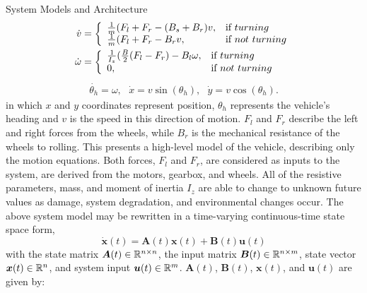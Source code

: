 \begin{section}{System Models and Architecture}
	\begin{equation}
    \begin{split}
    \label{eqn:plant}
    \dot{v}&=\left\{
    \begin{array}{ll}
    \frac{1}{m}(F_l+F_r-(B_s+B_r)v, & \hbox{if } turning\\
    \frac{1}{m}(F_l+F_r-B_rv, & \hbox{if } not~turning
    \end{array}
    \right.\\
    \dot{\omega}&=\left\{
    \begin{array}{ll}
    \frac{1}{I_z}(\frac{B}{2}(F_l-F_r)-B_l\omega, & \hbox{if } turning\\
    0, & \hbox{if } not~turning
    \end{array}
    \right.\\
    \end{split}
    \end{equation}
    \begin{align}
     \dot{\theta_h}=\omega,\text{ } \dot{x}=v\sin(\theta_h),\text{ } \dot{y}=v\cos(\theta_h).
	\end{align}
in which $x$ and $y$ coordinates represent position, $\theta_h$ represents the vehicle's heading
 and $v$ is the speed in this direction of motion. $F_l$ and $F_r$ describe the left and right forces from the wheels, while $B_r$ is the mechanical resistance of the wheels to rolling. 
This presents a high-level model of the vehicle, describing only the motion equations. Both forces, $F_l$ and $F_r$, are considered as inputs to the system, are derived from the motors, gearbox, and wheels. All of the resistive parameters, mass, and moment of inertia $I_z$ are able to change to unknown future values as damage, system degradation, and environmental changes occur. The above system model may be rewritten in a time-varying continuous-time state space form,
    \begin{equation}
	\dot{\bm{x}}(t) = \bm{A}(t)\bm{x}(t) + \bm{B}(t)\bm{u}(t)
	\end{equation}
with the state matrix $\bm{A}(t) \in \mathbb{R}^{n\times n}$, the input matrix $\bm{B}(t) \in \mathbb{R}^{n\times m}$, state vector $\bm{x}(t) \in \mathbb{R}^{n}$, and system input $\bm{u}(t) \in \mathbb{R}^{m}$. $\bm{A}(t)$, $\bm{B}(t)$, $\bm{x}(t)$, and $\bm{u}(t)$ are given by:


\end{section}
